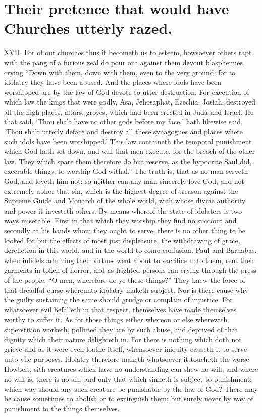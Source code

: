 \section*{Their pretence that would have Churches utterly razed.}
XVII. For of our churches thus it becometh us to esteem, howsoever others rapt with the pang of a furious zeal do pour out against them devout blasphemies, crying “Down with them, down with them, even to the very ground: for to idolatry they have been abused. And the places where idols have been worshipped are by the law of God devote to utter destruction. For execution of which law the kings that were godly, Asa, Jehosaphat, Ezechia, Josiah, destroyed all the high places, altars, groves, which had been erected in Juda and Israel. He that said, ‘Thou shalt have no other gods before my face,’ hath likewise said, ‘Thou shalt utterly deface and destroy all these synagogues and places where such idols have been worshipped.’ This law containeth the temporal punishment which God hath set down, and will that men execute, for the breach of the other law. They which spare them therefore do but reserve, as the hypocrite Saul did, execrable things, to worship God withal.”
The truth is, that as no man serveth God, and loveth him not; so neither can any man sincerely love God, and not extremely abhor that sin, which is the highest degree of treason against the Supreme Guide and Monarch of the whole world, with whose divine authority and power it investeth others. By means whereof the state of idolaters is two ways miserable. First in that which they worship they find no succour; and secondly at his hands whom they ought to serve, there is no other thing to be looked for but the effects of most just displeasure, the withdrawing of grace, dereliction in this world, and in the world to come confusion.  Paul and Barnabas, when infidels admiring their virtues went about to sacrifice unto them, rent their garments in token of horror, and as frighted persons ran crying through the press of the people, “O men, wherefore do ye these things?” They knew the force of that dreadful curse whereunto idolatry maketh subject. Nor is there cause why the guilty sustaining the same should grudge or complain of injustice. For whatsoever evil befalleth in that respect, themselves have made themselves worthy to suffer it.
As for those things either whereon or else wherewith superstition worketh, polluted they are by such abuse, and deprived of that dignity which their nature delighteth in. For there is nothing which doth not grieve and as it were even loathe itself, whensoever iniquity causeth it to serve unto vile purposes. Idolatry therefore maketh whatsoever it toucheth the worse. Howbeit, sith creatures which have no understanding can shew no will; and where no will is, there is no sin; and only that which sinneth is subject to punishment: which way should any such creature be punishable by the law of God? There may be cause sometimes to abolish or to extinguish them; but surely never by way of punishment to the things themselves.
